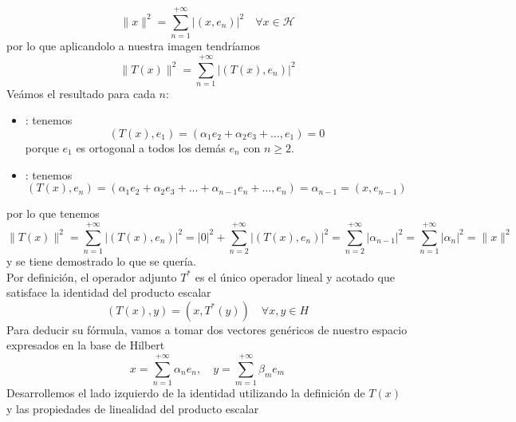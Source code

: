 \begin{ejercicio}
    \begin{equation*}
        \|x\|^2 = \sum_{n=1}^{+\infty} |(x, e_n)|^2 \quad \forall x\in \mathcal{H}
    \end{equation*}
    por lo que aplicandolo a nuestra imagen tendríamos
    \begin{equation*}
        \|T(x)\|^2 = \sum_{n=1}^{+\infty} |(T(x), e_n)|^2
    \end{equation*}
    Veámos el resultado para cada $n$:
    \begin{itemize}
        \item {}: tenemos
        \begin{equation*}
            (T(x), e_1) = \left( \alpha_1 e_2 + \alpha_2 e_3 + \dots, e_1 \right) = 0
        \end{equation*}
        porque $e_1$ es ortogonal a todos los demás $e_{n}$ con $n \geq 2$.
        \item {}: tenemos
        \begin{equation*}
            (T(x), e_n) = \left( \alpha_1 e_2 + \alpha_2 e_3 + \dots +\alpha_{n-1} e_n + \dots, e_n \right) = \alpha_{n-1} = (x, e_{n-1})
        \end{equation*}
    \end{itemize} 
    por lo que tenemos 
    \begin{equation*}
        \|T(x)\|^2 = \sum_{n=1}^{+\infty} |(T(x), e_n)|^2 = |0|^2 + \sum_{n=2}^{+\infty} |(T(x), e_{n})|^2 = \sum_{n=2}^{+\infty} |\alpha_{n-1}|^2 = \sum_{n=1}^{+\infty} |\alpha_n|^2 = \|x\|^2
    \end{equation*}
    y se tiene demostrado lo que se quería. \\

    \noindent
    Por definición, el operador adjunto $T^*$ es el único operador lineal y acotado que satisface la identidad del producto escalar
    $$( T(x), y ) = ( x, T^*(y) ) \quad \forall x, y \in H$$
    Para deducir su fórmula, vamos a tomar dos vectores genéricos de nuestro espacio expresados en la base de Hilbert
    \begin{equation*}
        x = \sum_{n=1}^{+\infty} \alpha_n e_n, \quad y = \sum_{m=1}^{+\infty} \beta_m e_m
    \end{equation*}
    Desarrollemos el lado izquierdo de la identidad utilizando la definición de $T(x)$ y las propiedades de linealidad del producto escalar
    

\end{ejercicio}
